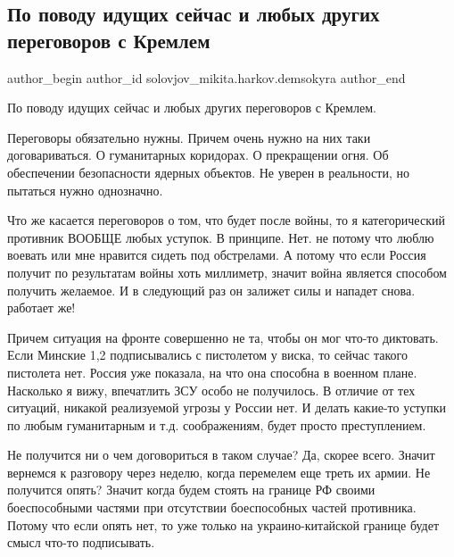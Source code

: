  
 
 
 
 

\subsection{По поводу идущих сейчас и любых других переговоров с Кремлем}
\label{sec:07_03_2022.fb.solovjov_mikita.harkov.demsokyra.1.po_povodu_idushchikh}

\ifcmt
 author_begin
   author_id solovjov_mikita.harkov.demsokyra
 author_end
\fi

По поводу идущих сейчас и любых других переговоров с Кремлем. 

Переговоры обязательно нужны. Причем очень нужно на них таки договариваться. О
гуманитарных коридорах. О прекращении огня. Об обеспечении безопасности ядерных
объектов. Не уверен в реальности, но пытаться нужно однозначно. 

Что же касается переговоров о том, что будет после войны, то я категорический
противник ВООБЩЕ любых уступок. В принципе. Нет. не потому что люблю воевать
или мне нравится сидеть под обстрелами. А потому что если Россия получит по
результатам войны хоть миллиметр, значит война является способом получить
желаемое. И в следующий раз он залижет силы и нападет снова. работает же! 

Причем ситуация на фронте совершенно не та, чтобы он мог что-то диктовать. Если
Минские 1,2 подписывались с пистолетом у виска, то сейчас такого пистолета нет.
Россия уже показала, на что она способна в военном плане. Насколько я вижу,
впечатлить ЗСУ особо не получилось. В отличие от тех ситуаций, никакой
реализуемой угрозы у России нет. И делать какие-то уступки по любым
гуманитарным и т.д. соображениям, будет просто преступлением. 

Не получится ни о чем договориться в таком случае? Да, скорее всего. Значит
вернемся к разговору через неделю, когда перемелем еще треть их армии. Не
получится опять? Значит когда будем стоять на границе РФ своими боеспособными
частями при отсутствии боеспособных частей противника. Потому что если опять
нет, то уже только на украино-китайской границе будет смысл что-то подписывать. 


